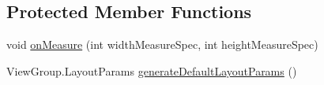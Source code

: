 \subsection*{Protected Member Functions}
\begin{DoxyCompactItemize}
\item 
void \hyperlink{classcom_1_1zia_1_1freshdocs_1_1widget_1_1fileexplorer_1_1carousel_1_1_carousel_spinner_a92a56388b4386ea2ef6f683acb40633f}{on\-Measure} (int width\-Measure\-Spec, int height\-Measure\-Spec)
\item 
View\-Group.\-Layout\-Params \hyperlink{classcom_1_1zia_1_1freshdocs_1_1widget_1_1fileexplorer_1_1carousel_1_1_carousel_spinner_a479eb05fd0f2f349757f2de0f9f4de89}{generate\-Default\-Layout\-Params} ()
\end{DoxyCompactItemize}



